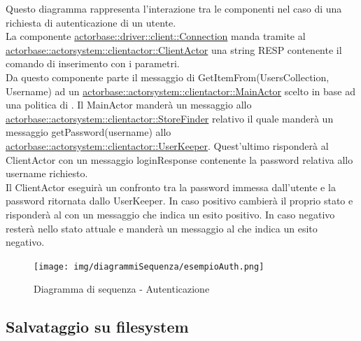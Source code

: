 \documentclass{scalatekids-article}
\begin{document}
Questo diagramma rappresenta l'interazione tra le componenti nel caso di una richiesta di autenticazione di un utente.\\
La componente \hyperref[sec:actorbase::driver::client::Connection]{actorbase::driver::client::Connection}
manda tramite  al \hyperref[sec:actorbase::actorsystem::clientactor::ClientActor]{actorbase::actorsystem::clientactor::ClientActor}
una string RESP contenente il comando di inserimento  con
i parametri.\\ %
Da questo componente parte il messaggio di GetItemFrom(UsersCollection, Username) ad un \hyperref[sec:actorbase::actorsystem::clientactor::MainActor]{actorbase::actorsystem::clientactor::MainActor} scelto in base ad una
politica di . Il MainActor manderà un messaggio allo \hyperref[sec:actorbase::actorsystem::clientactor::StoreFinder]{actorbase::actorsystem::clientactor::StoreFinder} relativo il quale manderà un messaggio getPassword(username) allo \hyperref[sec:actorbase::actorsystem::clientactor::UserKeeper]{actorbase::actorsystem::clientactor::UserKeeper}. Quest'ultimo risponderà al ClientActor con un messaggio loginResponse contenente la password relativa allo username richiesto.\\
Il ClientActor eseguirà un confronto tra la password immessa dall'utente e la password ritornata dallo UserKeeper. In caso positivo cambierà il proprio stato
e risponderà al  con un messaggio che indica un esito positivo. In caso negativo resterà nello stato attuale e manderà un messaggio al  che indica un esito negativo.
\begin{figure}[H]
  \begin{center}
    \texttt{[image: img/diagrammiSequenza/esempioAuth.png]}
    \caption{Diagramma di sequenza - Autenticazione}
  \end{center}
\end{figure}

\subsection{Salvataggio su filesystem}
\end{document}

